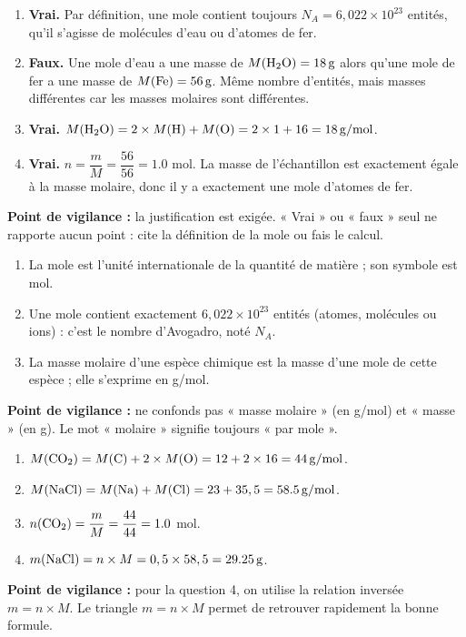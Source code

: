 \documentclass[11pt]{article}
\newcommand{\cle}[1]{{\popxbold\color{popdark}#1}}
\begin{document}
\begin{corrige}
\begin{enumerate}
\item \textbf{Vrai.} Par définition, une mole contient toujours $N_A = 6,022\times 10^{23}$ entités, qu'il s'agisse de molécules d'eau ou d'atomes de fer.
\item \textbf{Faux.} Une mole d'eau a une masse de $M(\ce{H2O}) = \SI{18}{g}$ alors qu'une mole de fer a une masse de $M(\ce{Fe}) = \SI{56}{g}$. Même nombre d'entités, mais masses différentes car les masses molaires sont différentes.
\item \textbf{Vrai.} $M(\ce{H2O}) = 2\times M(\ce{H}) + M(\ce{O}) = 2\times 1 + 16 = \SI{18}{g/mol}$.
\item \textbf{Vrai.} $n = \dfrac{m}{M} = \dfrac{56}{56} = \num{1,0}$ mol. La masse de l'échantillon est exactement égale à la masse molaire, donc il y a exactement une mole d'atomes de fer.
\end{enumerate}
\textbf{Point de vigilance :} la justification est exigée. « Vrai » ou « faux » seul ne rapporte aucun point : cite la définition de la mole ou fais le calcul.
\end{corrige}

\begin{corrige}
\begin{enumerate}
\item La \cle{mole} est l'unité internationale de la \cle{quantité de matière} ; son symbole est mol.
\item Une mole contient exactement $6,022\times 10^{23}$ \cle{entités} (atomes, molécules ou ions) : c'est le \cle{nombre d'Avogadro}, noté $N_A$.
\item La \cle{masse molaire} d'une espèce chimique est la masse d'une mole de cette espèce ; elle s'exprime en \unit{g/mol}.
\end{enumerate}
\textbf{Point de vigilance :} ne confonds pas « masse molaire » (en \unit{g/mol}) et « masse » (en g). Le mot « molaire » signifie toujours « par mole ».
\end{corrige}

\begin{corrige}
\begin{enumerate}
\item $M(\ce{CO2}) = M(\ce{C}) + 2\times M(\ce{O}) = 12 + 2\times 16 = \SI{44}{g/mol}$.
\item $M(\ce{NaCl}) = M(\ce{Na}) + M(\ce{Cl}) = 23 + 35,5 = \SI{58,5}{g/mol}$.
\item $n(\ce{CO2}) = \dfrac{m}{M} = \dfrac{44}{44} = \num{1,0}$ mol.
\item $m(\ce{NaCl}) = n\times M = 0,5\times 58,5 = \SI{29,25}{g}$.
\end{enumerate}
\textbf{Point de vigilance :} pour la question 4, on utilise la relation inversée $m = n\times M$. Le triangle $m = n\times M$ permet de retrouver rapidement la bonne formule.
\end{corrige}
\end{document}
